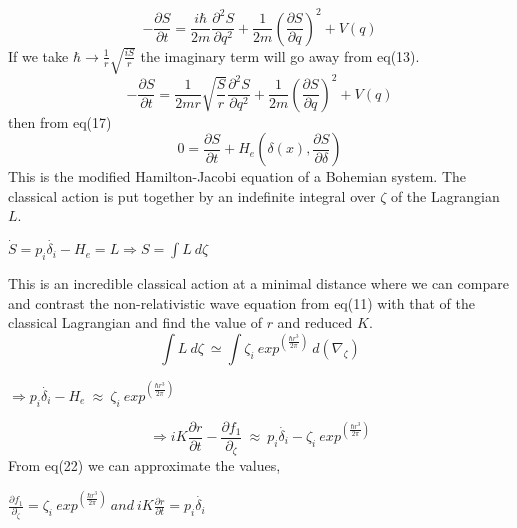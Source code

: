\documentclass{article}
\begin{document}
\begin{equation}
   -\frac{\partial{S}}{\partial{t}} = \frac{i\hbar}{2m}\frac{\partial^2{S}}{\partial{q}^2}+\frac{1}{2m}(\frac{\partial S}{\partial q})^2  +V(q) 
\end{equation}
If we take $\hbar \rightarrow
\frac{1}{r}\sqrt{\frac{iS}{r}} $ the imaginary term will go away from eq(13).
\begin{equation}
      -\frac{\partial{S}}{\partial{t}} = \frac{1}{2mr}\sqrt{\frac{S}{r}}\frac{\partial^2{S}}{\partial{q}^2}+\frac{1}{2m}(\frac{\partial S}{\partial q})^2 + V(q)
\end{equation}
then from eq(17)
\begin{equation}
    0=\frac{\partial{S}}{\partial{t}} + H_{e}(\delta (x),\frac{\partial S}{\partial \delta})
\end{equation}
This is the modified Hamilton-Jacobi equation of a Bohemian system. The classical action is put together by an indefinite integral over $\zeta$ of the Lagrangian $L$.
\begin{center}
\begin{math}
 \dot{S} = p_{i}\dot{\delta_{i}} - H_{e} = L  \Rightarrow S=\int L \ d \zeta
\end{math}
\end{center}
This is an incredible classical action at a minimal distance where we can compare and contrast the non-relativistic wave equation from eq(11) with that of the classical Lagrangian and find the value of $r$ and reduced $K$. \begin{equation}
  \int L \ d \zeta \ \simeq \int \zeta_{i}\ exp^(\frac{\hbar r^{3}}{2\pi})\ d(\nabla_\zeta)
  \end{equation}
\begin{center}
\begin{math}
     \Rightarrow p_{i}\dot{\delta_{i}} - H_{e} \ \approx \ \zeta_{i}\ exp^(\frac{\hbar r^{3}}{2\pi}) 
     \end{math}
\end{center}
\begin{equation}
 \Rightarrow iK\frac{\partial r}{\partial t} - \frac{\partial f_{1}}{\partial_{\zeta}} \ \approx \ p_{i}\dot{\delta_{i}} - \zeta_{i}\ exp^(\frac{\hbar r^{3}}{2\pi})
\end{equation}
From eq(22) we can approximate the values,
\begin{center}
\begin{math}
  \frac{\partial f_{1}}{\partial_{\zeta}} =   \zeta_{i}\ exp^(\frac{\hbar r^{3}}{2\pi})\ and \ iK\frac{\partial r}{\partial t} = p_{i}\dot{\delta_{i}}
  \end{math}
\end{center}
\end{document}
